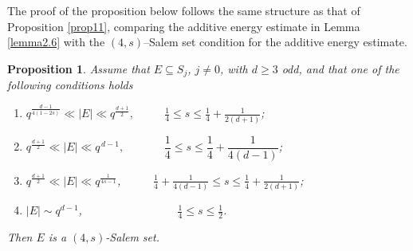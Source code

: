 \documentclass[11pt]{article}
\newtheorem{proposition}[theorem]{Proposition}
\begin{document}
The proof of the proposition  below follows  the same structure  as that of Proposition \ref{prop11},   comparing the additive energy estimate in Lemma \ref{lemma2.6} with  the $(4, s)$--Salem set condition for the additive energy estimate. 
\begin{proposition}\label{propro1}
Assume that $E \subseteq S_j$, $j\ne 0$, with $d \ge 3$ odd, and that one of the following conditions holds
\begin{enumerate} 
    \item[(i)] $q^{\frac{d-1}{4(1-2s)}} \ll |E| \ll q^{\frac{d+1}{2}}, \qquad~~~\frac{1}{4}\leq s \leq \frac{1}{4}+\frac{1}{2(d+1)}$; 
    \item[(ii)] $q^{\frac{d+1}{2}} \ll |E| \ll q^{\,d-1}, \qquad ~~~~~~~ \dfrac{1}{4} \le s \le \dfrac{1}{4} + \dfrac{1}{4(d-1)}$;
    \item[(iii)] $q^{\frac{d+1}{2}} \ll |E| \ll q^{\frac{1}{4s-1}}$,\qquad~~~~~ $\frac{1}{4}+\frac{1}{4(d-1)} \leq s \leq \frac{1}{4}+\frac{1}{2(d+1)}$; 
    \item[(iv)] $|E|\sim q^{d-1} $,\qquad~~~~~~~~~~~~~~~~ $ \frac{1}{4} \leq s\le\frac{1}{2}$. 
\end{enumerate}
Then $E$ is a $(4,s)$\textnormal{-Salem set.}
\end{proposition}
\end{document}
